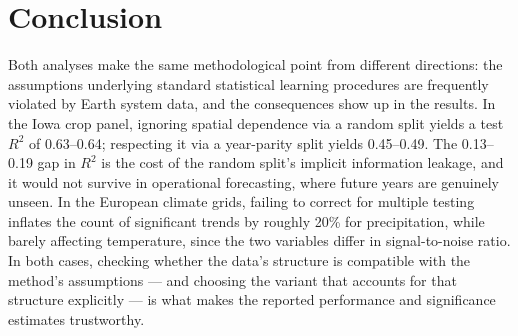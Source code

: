 \documentclass[11pt,a4paper]{article}
\begin{document}
\section{Conclusion}

Both analyses make the same methodological point from different directions: the
assumptions underlying standard statistical learning procedures are frequently
violated by Earth system data, and the consequences show up in the results. In
the Iowa crop panel, ignoring spatial dependence via a random split yields a
test $R^2$ of 0.63--0.64; respecting it via a year-parity split yields
0.45--0.49. The 0.13--0.19 gap in $R^2$ is the cost of the random split's
implicit information leakage, and it would not survive in operational
forecasting, where future years are genuinely unseen. In the European climate
grids, failing to correct for multiple testing inflates the count of significant
trends by roughly 20\% for precipitation, while barely affecting temperature,
since the two variables differ in signal-to-noise ratio. In both cases, checking
whether the data's structure is compatible with the method's assumptions --- and
choosing the variant that accounts for that structure explicitly --- is what
makes the reported performance and significance estimates trustworthy.

\end{document}
